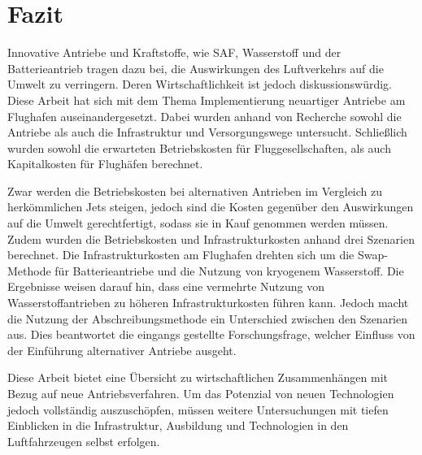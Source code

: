 \chapter{Fazit}
\label{ch:Fazit}
Innovative Antriebe und Kraftstoffe, wie SAF, Wasserstoff und der Batterieantrieb tragen dazu bei, die Auswirkungen des Luftverkehrs auf die Umwelt zu verringern.
Deren Wirtschaftlichkeit ist jedoch diskussionswürdig.
Diese Arbeit hat sich mit dem Thema Implementierung neuartiger Antriebe am Flughafen auseinandergesetzt. 
Dabei wurden anhand von Recherche sowohl die Antriebe als auch die Infrastruktur und Versorgungswege untersucht.
Schließlich wurden sowohl die erwarteten Betriebskosten für Fluggesellschaften, als auch Kapitalkosten für Flughäfen berechnet.

Zwar werden die Betriebskosten bei alternativen Antrieben im Vergleich zu herkömmlichen Jets steigen, 
jedoch sind die Kosten gegenüber den Auswirkungen auf die Umwelt gerechtfertigt, sodass sie in Kauf genommen werden müssen.
Zudem wurden die Betriebskosten und Infrastrukturkosten anhand drei Szenarien berechnet. 
Die Infrastrukturkosten am Flughafen drehten sich um die Swap-Methode für Batterieantriebe 
und die Nutzung von kryogenem Wasserstoff.
Die Ergebnisse weisen darauf hin, dass eine vermehrte Nutzung von Wasserstoffantrieben zu 
höheren Infrastrukturkosten führen kann.
Jedoch macht die Nutzung der Abschreibungsmethode ein Unterschied zwischen den Szenarien aus. 
Dies beantwortet die eingangs gestellte Forschungsfrage, welcher Einfluss von der Einführung alternativer Antriebe ausgeht.

Diese Arbeit bietet eine Übersicht zu wirtschaftlichen Zusammenhängen mit Bezug auf neue Antriebsverfahren.
Um das Potenzial von neuen Technologien jedoch vollständig auszuschöpfen, müssen weitere Untersuchungen 
mit tiefen Einblicken in die Infrastruktur, Ausbildung und Technologien in den Luftfahrzeugen selbst erfolgen.
